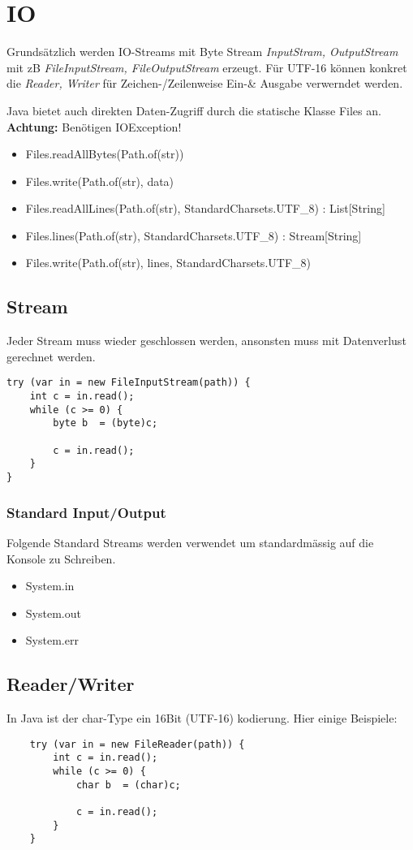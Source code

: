 \section{IO}
Grundsätzlich werden IO-Streams mit Byte Stream \textit{InputStram, OutputStream} mit zB \textit{FileInputStream, FileOutputStream} erzeugt. Für UTF-16 können konkret die \textit{Reader, Writer} für Zeichen-/Zeilenweise Ein-\& Ausgabe verwerndet werden.

\noindent Java bietet auch direkten Daten-Zugriff durch die statische Klasse Files an. \textbf{Achtung:} Benötigen IOException!
\begin{itemize}[nosep]
	\item Files.readAllBytes(Path.of(str))
	\item Files.write(Path.of(str), data)
	\item Files.readAllLines(Path.of(str), StandardCharsets.UTF\_8) : List[String]
	\item Files.lines(Path.of(str), StandardCharsets.UTF\_8) : Stream[String]
	\item Files.write(Path.of(str), lines, StandardCharsets.UTF\_8)
\end{itemize}

\subsection{Stream}
Jeder Stream muss wieder geschlossen werden, ansonsten muss mit Datenverlust gerechnet werden.
\begin{lstlisting}
try (var in = new FileInputStream(path)) {
	int c = in.read();
	while (c >= 0) {
		byte b  = (byte)c;
		
		c = in.read();
	}
}
\end{lstlisting}

\subsubsection{Standard Input/Output}
Folgende Standard Streams werden verwendet um standardmässig auf die Konsole zu Schreiben.
\begin{itemize}[nosep]
	\item System.in
	\item System.out
	\item System.err
\end{itemize}

\subsection{Reader/Writer}
In Java ist der char-Type ein 16Bit (UTF-16) kodierung. Hier einige Beispiele:
\begin{lstlisting}
	try (var in = new FileReader(path)) {
		int c = in.read();
		while (c >= 0) {
			char b  = (char)c;
			
			c = in.read();
		}
	}
\end{lstlisting}

